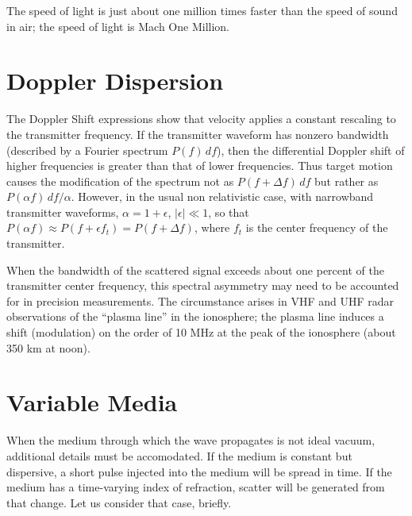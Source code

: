 \begin{factoid} The speed of light is just about one million times faster
than the speed of sound in air; the speed of light is Mach One
Million.
\end{factoid}

\section{Doppler Dispersion}

The Doppler Shift expressions show that velocity applies a constant
rescaling to the transmitter frequency.  If the transmitter waveform
has nonzero bandwidth (described by a Fourier spectrum $P(f)\, df$),
then the differential Doppler shift of higher frequencies is greater
than that of lower frequencies.  Thus target motion causes the
modification of the spectrum not as $P(f + \Delta f) \, df$ but rather
as $P(\alpha f) \,df\!/\!\alpha$.  However, in the usual non
relativistic case, with narrowband transmitter waveforms, $\alpha = 1
+ \epsilon$, $|\epsilon| \ll 1$, so that $P(\alpha f) \approx P(f +
\epsilon f_t) = P(f + \Delta f)$, where $f_t$ is the center frequency
of the transmitter.

When the bandwidth of the scattered signal exceeds about one percent
of the transmitter center frequency, this spectral asymmetry may need
to be accounted for in precision measurements.  The circumstance
arises in VHF and UHF radar observations of the ``plasma line'' in the
ionosphere; the plasma line induces a shift (modulation) on the order
of 10 MHz at the peak of the ionosphere (about 350 km at noon).

\section{Variable Media}

When the medium through which the wave propagates is not ideal vacuum,
additional details must be accomodated.  If the medium is constant but
dispersive, a short pulse injected into the medium will be spread in
time.  If the medium has a time-varying index of refraction, scatter will
be generated from that change.  Let us consider that case, briefly.

